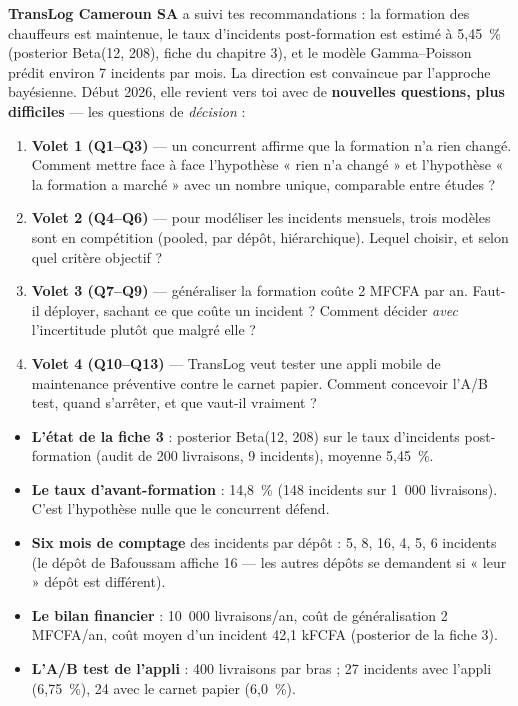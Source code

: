 \documentclass[11pt,a4paper]{article}
\begin{document}
\begin{contexte}
\textbf{TransLog Cameroun SA} a suivi tes recommandations : la formation des
chauffeurs est maintenue, le taux d'incidents post-formation est estimé à
5,45~\% (posterior Beta(12, 208), fiche du chapitre 3), et le modèle
Gamma--Poisson prédit environ 7 incidents par mois. La direction est
convaincue par l'approche bayésienne. Début 2026, elle revient vers toi avec
de \textbf{nouvelles questions, plus difficiles} --- les questions de
\emph{décision} :

\begin{enumerate}[leftmargin=5mm, itemsep=1mm]
  \item \textbf{Volet 1 (Q1--Q3)} --- un concurrent affirme que la formation
        n'a rien changé. Comment mettre face à face l'hypothèse « rien n'a
        changé » et l'hypothèse « la formation a marché » avec un nombre
        unique, comparable entre études ?
  \item \textbf{Volet 2 (Q4--Q6)} --- pour modéliser les incidents mensuels,
        trois modèles sont en compétition (pooled, par dépôt, hiérarchique).
        Lequel choisir, et selon quel critère objectif ?
  \item \textbf{Volet 3 (Q7--Q9)} --- généraliser la formation coûte 2 MFCFA
        par an. Faut-il déployer, sachant ce que coûte un incident ? Comment
        décider \emph{avec} l'incertitude plutôt que malgré elle ?
  \item \textbf{Volet 4 (Q10--Q13)} --- TransLog veut tester une appli mobile
        de maintenance préventive contre le carnet papier. Comment concevoir
        l'A/B test, quand s'arrêter, et que vaut-il vraiment ?
\end{enumerate}
\end{contexte}

\begin{application}
\begin{itemize}[leftmargin=4mm, itemsep=0.5mm]
  \item \textbf{L'état de la fiche 3} : posterior Beta(12, 208) sur le taux
        d'incidents post-formation (audit de 200 livraisons, 9 incidents),
        moyenne 5,45~\%.
  \item \textbf{Le taux d'avant-formation} : 14,8~\% (148 incidents sur
        1~000 livraisons). C'est l'hypothèse nulle que le concurrent défend.
  \item \textbf{Six mois de comptage} des incidents par dépôt :
        5, 8, 16, 4, 5, 6 incidents (le dépôt de Bafoussam affiche 16 --- les
        autres dépôts se demandent si « leur » dépôt est différent).
  \item \textbf{Le bilan financier} : 10~000 livraisons/an, coût de
        généralisation 2 MFCFA/an, coût moyen d'un incident 42,1 kFCFA
        (posterior de la fiche 3).
  \item \textbf{L'A/B test de l'appli} : 400 livraisons par bras ;
        27 incidents avec l'appli (6,75~\%), 24 avec le carnet papier
        (6,0~\%).
\end{itemize}
\end{application}
\end{document}
